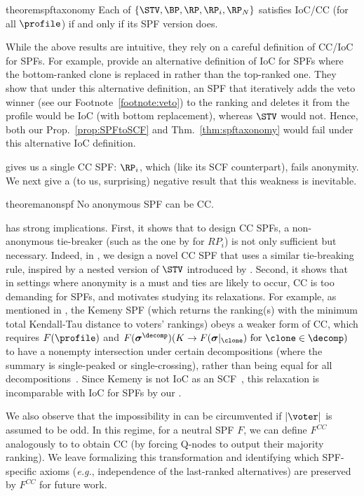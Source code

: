 \begin{restatable}{theorem}{spftaxonomy}\label{thm:spftaxonomy}
    Each of $\{\STV, \BP, \RP, \RP_i,\RP_N\}$ satisfies IoC/CC (for all $\profile$) if and only if its SPF version does. 
\end{restatable}

While the above results are intuitive, they rely on a careful definition of CC/IoC for SPFs. For example, \citet[Appendix A]{Boehmer23:Rank} provide an alternative definition of IoC for SPFs where the bottom-ranked clone is replaced in  rather than the top-ranked one. They show that under this alternative definition, an SPF that iteratively adds the veto winner (see our Footnote~\ref{footnote:veto}) to the ranking and deletes it from the profile would be IoC (with bottom replacement), whereas $\STV$ would not. Hence, both our Prop.~\ref{prop:SPFtoSCF} and Thm.~\ref{thm:spftaxonomy} would fail under this alternative IoC definition.

 gives us a single CC SPF: $\RP_i$, which (like its SCF counterpart), fails anonymity. We next give a (to us, surprising) negative result that this weakness is inevitable.

\begin{restatable}{theorem}{anonspf}\label{thm:anonspf}
    No anonymous SPF can be CC.
\end{restatable}

 has strong implications. First, it shows that to design CC SPFs, a non-anonymous tie-breaker (such as the one by \citet{Zavist89:Complete} for $RP_i$) is not only sufficient but necessary. Indeed, in , we design a novel CC SPF that uses a similar tie-breaking rule, inspired by a nested version of $\STV$ introduced by \citet{Freeman14:Axiomatic}. Second, it shows that in settings where anonymity is a must and ties are likely to occur, CC is too demanding for SPFs, and motivates studying its relaxations. For example, as mentioned in , the Kemeny SPF (which returns the ranking(s) with the minimum total Kendall-Tau distance to voters' rankings) obeys a weaker form of CC, which requires $F(\profile)$ and $F(\boldsymbol{\sigma}^\decomp)(K \rightarrow F(\boldsymbol{\sigma}|_\clone)\text{ for }\clone \in \decomp)$ to have a nonempty intersection under certain decompositions (where the summary is single-peaked or single-crossing), rather than being equal for all decompositions~\citep{Cornaz13:Kemeny}. Since Kemeny is not IoC as an SCF~\citep{Tideman87:Independence}, this relaxation is incomparable with IoC for SPFs by our . 

We also observe that the impossibility in  can be circumvented if $|\voter|$ is assumed to be odd. In this regime, for a neutral SPF $F$, we can define $F^{CC}$ analogously to  to obtain CC (by forcing Q-nodes to output their majority ranking). We leave formalizing this transformation and identifying which SPF-specific axioms (\emph{e.g.}, independence of the last-ranked alternatives) are preserved by $F^{CC}$ for future work.


